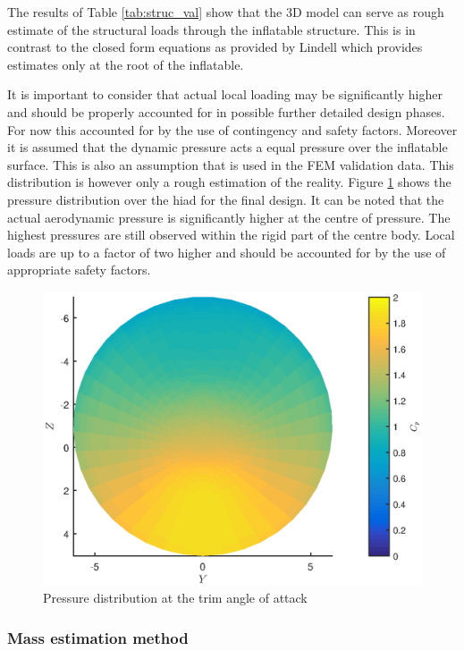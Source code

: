 The results of Table \ref{tab:struc_val} show that the 3D model can serve as rough estimate of the structural loads through the inflatable structure. This is in contrast to the closed form equations as provided by Lindell \cite{Lindell2006} which provides estimates only at the root of the inflatable. 

It is important to consider that actual local loading may be significantly higher and should be properly accounted for in possible further detailed design phases. For now this accounted for by the use of contingency and safety factors. Moreover it is assumed that the dynamic pressure acts a equal pressure over the inflatable surface. This is also an assumption that is used in the FEM validation data. This distribution is however only a rough estimation of the reality. Figure \ref{fig:struc_pres} shows the pressure distribution over the \gls{hiad} for the final design. It can be noted that the actual aerodynamic pressure is significantly higher at the centre of pressure. The highest pressures are still observed within the rigid part of the centre body. Local loads are up to a factor of two higher and should be accounted for by the use of appropriate safety factors.

\begin{figure}[h]
\centering
\includegraphics[width=1\textwidth]{./Figure/Structure/FrontviewCpDist}
\caption{Pressure distribution at the trim angle of attack} 
\label{fig:struc_pres}
\end{figure}

\subsubsection{Mass estimation method}


